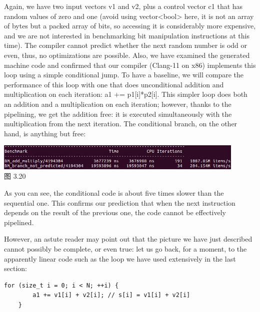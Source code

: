 Again, we have two input vectors v1 and v2, plus a control vector c1 that has random values of zero and one (avoid using vector<bool> here, it is not an array of bytes but a packed array of bits, so accessing it is considerably more expensive, and we are not interested in benchmarking bit manipulation instructions at this time). The compiler cannot predict whether the next random number is odd or even, thus, no optimizations are possible. Also, we have examined the generated machine code and confirmed that our compiler (Clang-11 on x86) implements this loop using a simple conditional jump. To have a baseline, we will compare the performance of this loop with one that does unconditional addition and multiplication on each iteration: a1 += p1[i]*p2[i]. This simpler loop does both an addition and a multiplication on each iteration; however, thanks to the pipelining, we get the addition free: it is executed simultaneously with the multiplication from the next iteration. The conditional branch, on the other hand, is anything but free:

\begin{center}
\includegraphics[width=0.9\textwidth]{content/1/chapter3/images/20.jpg}\\
图 3.20
\end{center}

As you can see, the conditional code is about five times slower than the sequential one. This confirms our prediction that when the next instruction depends on the result of the previous one, the code cannot be effectively pipelined.



However, an astute reader may point out that the picture we have just described cannot possibly be complete, or even true: let us go back, for a moment, to the apparently linear code such as the loop we have used extensively in the last section:

\begin{lstlisting}[style=styleCXX]
	for (size_t i = 0; i < N; ++i) {
		a1 += v1[i] + v2[i]; // s[i] = v1[i] + v2[i]
	}
\end{lstlisting}

